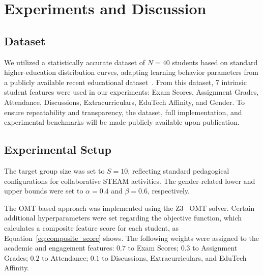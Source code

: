 \documentclass{icai2026} %
\begin{document}
\section{Experiments and Discussion}\label{section:experiments}

\subsection{Dataset}\label{section:dataset}

We utilized a statistically accurate dataset of $N=40$ students based on standard higher-education distribution curves, adapting learning behavior parameters from a publicly available recent educational dataset~\cite{student_engagement_data}.
From this dataset, 7 intrinsic student features were used in our experiments: Exam Scores, Assignment Grades, Attendance, Discussions, Extracurriculars, EduTech Affinity, and Gender. To ensure repeatability and transparency, the dataset, full implementation, and experimental benchmarks will be made publicly available upon publication.

\subsection{Experimental Setup}\label{section:setup}

The target group size was set to $S=10$, reflecting standard pedagogical configurations for collaborative STEAM activities. The gender-related lower and upper bounds were set to $\alpha = 0.4$ and $\beta = 0.6$, respectively.

The OMT-based approach was implemented using the Z3~\cite{DeMoura2008} OMT solver.
Certain additional hyperparameters were set regarding the objective function, which calculates a composite feature score for each student, as Equation~\eqref{eq:composite_score} shows. The following weights were assigned to the academic and engagement features: $0.7$ to Exam Scores; $0.3$ to Assignment Grades; $0.2$ to Attendance; $0.1$ to Discussions, Extracurriculars, and EduTech Affinity.
\end{document}
